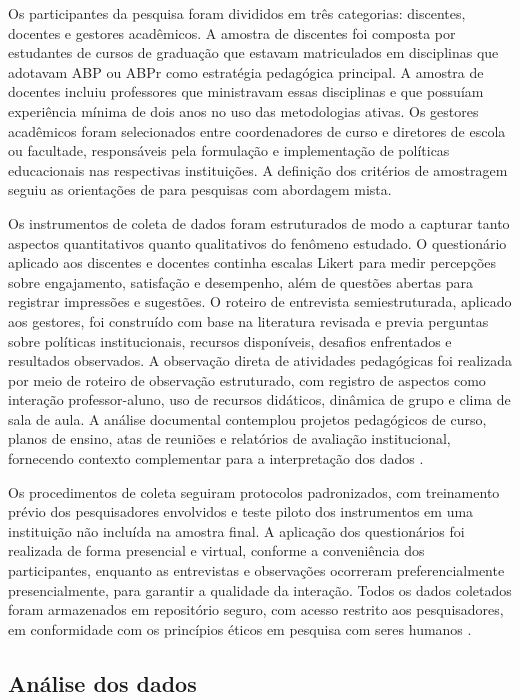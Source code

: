 Os participantes da pesquisa foram divididos em três categorias: discentes, docentes e gestores acadêmicos. A amostra de discentes foi composta por estudantes de cursos de graduação que estavam matriculados em disciplinas que adotavam ABP ou ABPr como estratégia pedagógica principal. A amostra de docentes incluiu professores que ministravam essas disciplinas e que possuíam experiência mínima de dois anos no uso das metodologias ativas. Os gestores acadêmicos foram selecionados entre coordenadores de curso e diretores de escola ou facultade, responsáveis pela formulação e implementação de políticas educacionais nas respectivas instituições. A definição dos critérios de amostragem seguiu as orientações de \cite{CRESWELL2018} para pesquisas com abordagem mista.

Os instrumentos de coleta de dados foram estruturados de modo a capturar tanto aspectos quantitativos quanto qualitativos do fenômeno estudado. O questionário aplicado aos discentes e docentes continha escalas Likert para medir percepções sobre engajamento, satisfação e desempenho, além de questões abertas para registrar impressões e sugestões. O roteiro de entrevista semiestruturada, aplicado aos gestores, foi construído com base na literatura revisada e previa perguntas sobre políticas institucionais, recursos disponíveis, desafios enfrentados e resultados observados. A observação direta de atividades pedagógicas foi realizada por meio de roteiro de observação estruturado, com registro de aspectos como interação professor-aluno, uso de recursos didáticos, dinâmica de grupo e clima de sala de aula. A análise documental contemplou projetos pedagógicos de curso, planos de ensino, atas de reuniões e relatórios de avaliação institucional, fornecendo contexto complementar para a interpretação dos dados \cite{BARDIN2016}.

Os procedimentos de coleta seguiram protocolos padronizados, com treinamento prévio dos pesquisadores envolvidos e teste piloto dos instrumentos em uma instituição não incluída na amostra final. A aplicação dos questionários foi realizada de forma presencial e virtual, conforme a conveniência dos participantes, enquanto as entrevistas e observações ocorreram preferencialmente presencialmente, para garantir a qualidade da interação. Todos os dados coletados foram armazenados em repositório seguro, com acesso restrito aos pesquisadores, em conformidade com os princípios éticos em pesquisa com seres humanos \cite{SANTOS2024}.

\subsection{Análise dos dados}
\label{subsec:analise_dados}


